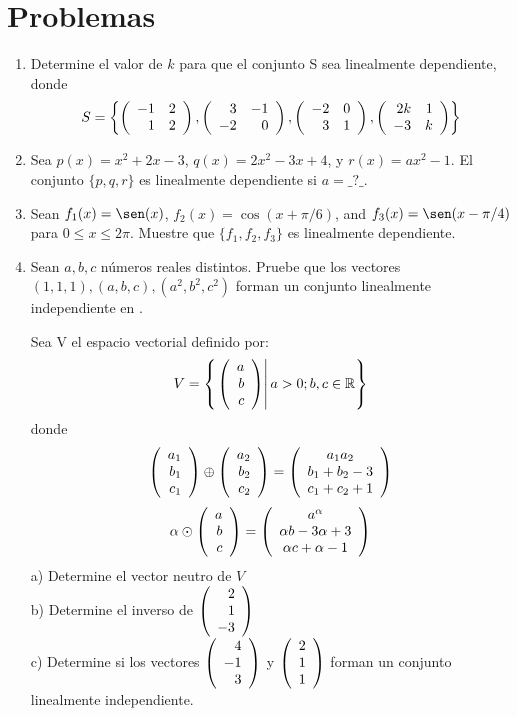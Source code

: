 \section{Problemas}
\begin{enumerate}


\item
Determine el valor de $k$ para que el conjunto S sea linealmente dependiente, donde $$S=\left\{ \left( \begin{array}{rr} -1&2\\ 1&2 \end{array} \right) ,  \left( \begin{array}{rr} 3&-1\\ -2&0 \end{array} \right) ,  \left( \begin{array}{rr} -2&0\\ 3&1 \end{array} \right) , \left( \begin{array}{rr} 2k&1\\ -3&k \end{array} \right) \right\}$$


\item
Sea $p(x)= x^2+2x-3$, $q(x)=2x^2-3x+4$, y $r(x)=ax^2-1$. El conjunto $\{p, q, r\}$ es
linealmente dependiente si $a=\_?\_$.

\item
Sean $f_1(x) = \sen(x)$, $f_2(x) = \cos(x+\pi/6)$, and $f_3(x) = \sen(x-\pi/4)$ para $0 \leq x \leq 2\pi$. Muestre que 
$\{f_1, f_2, f_3\}$ es linealmente dependiente.


\item
Sean $a, b, c$ números reales distintos. Pruebe que los vectores $(1, 1, 1), (a, b, c), (a^2, b^2, c^2)$ forman un conjunto linealmente independiente en \rtres.



\begin{prob}[]
Sea V el espacio vectorial definido por:
\[V=\left\{ \left. \left( \begin{array}{r} a\\ b\\ c \end{array} \right) \right| a>0; b, c\in \mathbb{R} \right\}\]
donde
\[ \left( \begin{array}{r} a_1\\ b_1\\ c_1 \end{array} \right) \oplus\left( \begin{array}{r} a_2\\ b_2\\ c_2 \end{array} \right) =\left(
\begin{array}{c}
a_1a_2\\
b_1+b_2-3\\
c_1+c_2+1
\end{array}
\right)
\]
\[\alpha\odot\left( \begin{array}{r} a\\ b\\ c \end{array} \right) =\left(
\begin{array}{c}
a^\alpha\\
\alpha b-3\alpha+3\\
\alpha c+\alpha-1
\end{array}
\right)\]
a) Determine el vector neutro de $V$
~\\b) Determine el inverso de $\left( \begin{array}{r} 2\\ 1\\ -3 \end{array} \right) $
~\\c) Determine si los vectores $\left( \begin{array}{r} 4\\ -1\\ 3 \end{array} \right) $ y $\left( \begin{array}{r} 2\\ 1\\ 1 \end{array} \right) $ forman un conjunto linealmente independiente.


\end{prob}
\end{enumerate}

